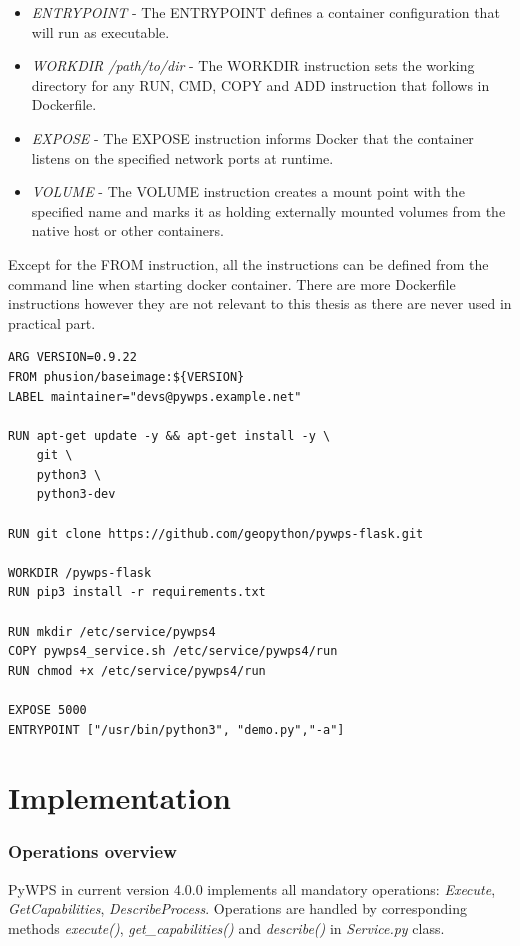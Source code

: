 \documentclass[12pt,a4paper]{article}
\begin{document}
\begin{itemize}
\item \textit{ENTRYPOINT} - The ENTRYPOINT defines a container configuration that will run as executable.
\item \textit{WORKDIR /path/to/dir} - The WORKDIR instruction sets the working directory for any RUN, CMD, COPY and ADD instruction that follows in Dockerfile.
\item \textit{EXPOSE} - The EXPOSE instruction informs Docker that the container listens on the specified network ports at runtime.
\item \textit{VOLUME} - The VOLUME instruction creates a mount point with the specified name and marks it as holding externally mounted volumes from the native host or other containers.
\end{itemize}

Except for the FROM instruction, all the instructions can be defined from the command line when starting docker container. There are more Dockerfile instructions however they are not relevant to this thesis as there are never used in practical part.

\newpage
\begin{lstlisting}[basicstyle=\small,caption={Dockerfile example}]
ARG VERSION=0.9.22
FROM phusion/baseimage:${VERSION}
LABEL maintainer="devs@pywps.example.net"

RUN apt-get update -y && apt-get install -y \
	git \
	python3 \
	python3-dev

RUN git clone https://github.com/geopython/pywps-flask.git
 
WORKDIR /pywps-flask
RUN pip3 install -r requirements.txt

RUN mkdir /etc/service/pywps4
COPY pywps4_service.sh /etc/service/pywps4/run
RUN chmod +x /etc/service/pywps4/run

EXPOSE 5000
ENTRYPOINT ["/usr/bin/python3", "demo.py","-a"]
\end{lstlisting}

\newpage
\part{Implementation}
\newpage
\section{Operations overview}
\label{sec:operations_ov}
PyWPS in current version 4.0.0 implements all mandatory operations: \textit{Execute}, \textit{GetCapabilities}, \textit{DescribeProcess}.
Operations are handled by corresponding methods \textit{execute()}, \textit{get\_capabilities()} and \textit{describe()} in \textit{Service.py} class. 
\end{document}

